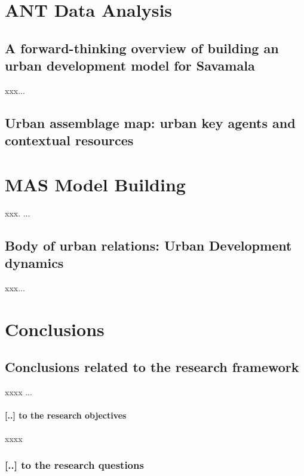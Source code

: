 \documentclass[11pt]{report}
\begin{document}
\chapter{ANT Data Analysis}

\section{A forward-thinking overview of building an urban development model for Savamala}

xxx...

\section{Urban assemblage map: urban key agents and contextual resources}

\chapter{MAS Model Building}


xxx. ...

\section{Body of urban relations: Urban Development dynamics}

xxx...


\chapter{Conclusions}


\section{Conclusions related to the research framework}

xxxx ...

\subsubsection{[..] to the research objectives}

xxxx

\subsection{[..] to the research questions}
\end{document}
